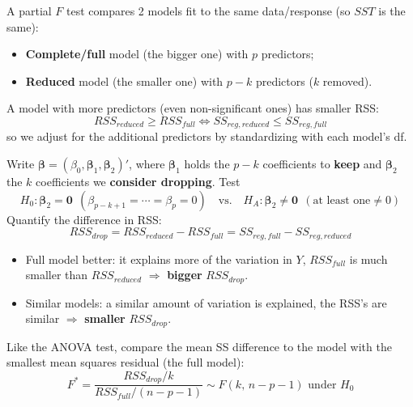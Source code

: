 \begin{definition}
    A partial $F$ test compares 2 models fit to the same data/response (so $SST$ is the same):
    \begin{itemize}
        \item \textbf{Complete/full} model (the bigger one) with $p$ predictors;
        \item \textbf{Reduced} model (the smaller one) with $p-k$ predictors ($k$ removed).
    \end{itemize}
    A model with more predictors (even non-significant ones) has smaller RSS:
    \[RSS_{reduced}\geq RSS_{full}\iff SS_{reg,reduced}\leq SS_{reg,full}\]
    so we adjust for the additional predictors by standardizing with each model's df.
\end{definition}

\begin{definition}
    Write $\boldsymbol\beta=(\beta_0,\boldsymbol\beta_1,\boldsymbol\beta_2)'$, where
    $\boldsymbol\beta_1$ holds the $p-k$ coefficients to \textbf{keep} and $\boldsymbol\beta_2$
    the $k$ coefficients we \textbf{consider dropping}. Test
    \[H_0:\boldsymbol\beta_2=\mathbf{0}\ \ (\beta_{p-k+1}=\cdots=\beta_p=0)\quad\text{vs.}\quad H_A:\boldsymbol\beta_2\neq\mathbf{0}\ \ (\text{at least one}\neq0)\]
    Quantify the difference in RSS:
    \[RSS_{drop}=RSS_{reduced}-RSS_{full}=SS_{reg,full}-SS_{reg,reduced}\]
    \begin{itemize}
        \item Full model better: it explains more of the variation in $Y$, $RSS_{full}$ is much
        smaller than $RSS_{reduced}$ $\Rightarrow$ \textbf{bigger} $RSS_{drop}$.
        \item Similar models: a similar amount of variation is explained, the RSS's are similar
        $\Rightarrow$ \textbf{smaller} $RSS_{drop}$.
    \end{itemize}
    Like the ANOVA test, compare the mean SS difference to the model with the smallest
    mean squares residual (the full model):
    \[\boxed{F^*=\frac{RSS_{drop}/k}{RSS_{full}/(n-p-1)}\sim F(k,\,n-p-1)\text{ under }H_0}\]
\end{definition}

